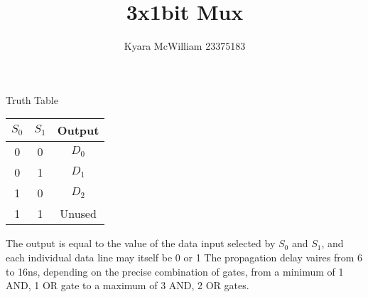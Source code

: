 \documentclass{article}
\title{3x1bit Mux}
\author{Kyara McWilliam 23375183}
\date{}
\begin{document}
\maketitle

Truth Table

\begin{tabular}{ |c|c|c| }
\hline
$S_0$ & $S_1$ & Output \\
\hline
0 & 0 & $D_0$ \\
0 & 1 & $D_1$ \\
1 & 0 & $D_2$ \\ 
1 & 1 & Unused \\
\hline
\end{tabular}

\hfill \break

The output is equal to the value of the data input selected by $S_0$ and $S_1$, and each individual data line may itself be 0 or 1 \newline
The propagation delay vaires from 6 to 16ns, depending on the precise combination of gates, from a minimum of 1 AND, 1 OR gate to a maximum of 3 AND, 2 OR gates.
\end{document}
